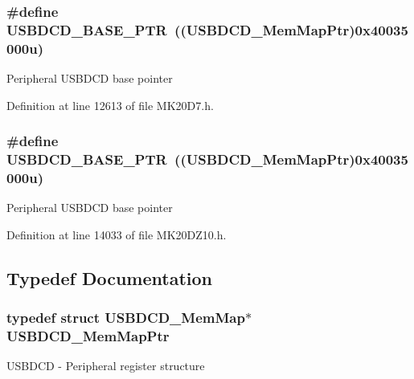 \subsubsection[{\texorpdfstring{U\+S\+B\+D\+C\+D\+\_\+\+B\+A\+S\+E\+\_\+\+P\+TR}{USBDCD_BASE_PTR}}]{\setlength{\rightskip}{0pt plus 5cm}\#define U\+S\+B\+D\+C\+D\+\_\+\+B\+A\+S\+E\+\_\+\+P\+TR~(({\bf U\+S\+B\+D\+C\+D\+\_\+\+Mem\+Map\+Ptr})0x40035000u)}\hypertarget{group___u_s_b_d_c_d___peripheral_ga6289dc687e9b991508629237aeb61755}{}\label{group___u_s_b_d_c_d___peripheral_ga6289dc687e9b991508629237aeb61755}
Peripheral U\+S\+B\+D\+CD base pointer 

Definition at line 12613 of file M\+K20\+D7.\+h.

\subsubsection[{\texorpdfstring{U\+S\+B\+D\+C\+D\+\_\+\+B\+A\+S\+E\+\_\+\+P\+TR}{USBDCD_BASE_PTR}}]{\setlength{\rightskip}{0pt plus 5cm}\#define U\+S\+B\+D\+C\+D\+\_\+\+B\+A\+S\+E\+\_\+\+P\+TR~(({\bf U\+S\+B\+D\+C\+D\+\_\+\+Mem\+Map\+Ptr})0x40035000u)}\hypertarget{group___u_s_b_d_c_d___peripheral_ga6289dc687e9b991508629237aeb61755}{}\label{group___u_s_b_d_c_d___peripheral_ga6289dc687e9b991508629237aeb61755}
Peripheral U\+S\+B\+D\+CD base pointer 

Definition at line 14033 of file M\+K20\+D\+Z10.\+h.



\subsection{Typedef Documentation}
\subsubsection[{\texorpdfstring{U\+S\+B\+D\+C\+D\+\_\+\+Mem\+Map\+Ptr}{USBDCD_MemMapPtr}}]{\setlength{\rightskip}{0pt plus 5cm}typedef struct {\bf U\+S\+B\+D\+C\+D\+\_\+\+Mem\+Map}$\ast$ {\bf U\+S\+B\+D\+C\+D\+\_\+\+Mem\+Map\+Ptr}}\hypertarget{group___u_s_b_d_c_d___peripheral_gad6e68bd3ca7f14168c34ff5e824dd321}{}\label{group___u_s_b_d_c_d___peripheral_gad6e68bd3ca7f14168c34ff5e824dd321}
U\+S\+B\+D\+CD -\/ Peripheral register structure 
